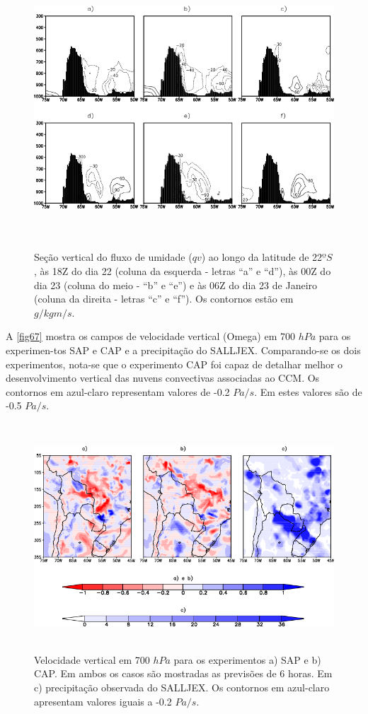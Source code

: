 \begin{figure}
\centering
\includegraphics[height=10.5cm]{./figs/sec_vert_flux_umi.png}
\caption{Seção vertical do fluxo de umidade ($qv$) ao longo da latitude de 22$ºS$, às 18Z do dia 22 (coluna da esquerda - letras ``a'' e ``d''), às 00Z do dia 23 (coluna do meio - ``b'' e ``e'') e às 06Z do dia 23 de Janeiro (coluna da direita - letras ``c'' e ``f''). Os contornos estão em $g/kg m/s$.}
\label{fig66}
\end{figure}

A \autoref{fig67} mostra os campos de velocidade vertical (Omega) em 700 $hPa$ para os experimen-tos SAP e CAP e a precipitação do SALLJEX. Comparando-se os dois experimentos, nota-se que o experimento CAP foi capaz de detalhar melhor o desenvolvimento vertical das nuvens convectivas associadas ao CCM. Os contornos em azul-claro representam valores de -0.2 $Pa/s$. Em  estes valores são de -0.5 $Pa/s$.
 
\begin{figure}
\centering
\includegraphics[height=8.5cm]{./figs/vel_vert_omega_salljex.png}
\caption{Velocidade vertical em 700 $hPa$ para os experimentos a) SAP e b) CAP. Em ambos os casos são mostradas as previsões de 6 horas. Em c) precipitação observada do SALLJEX. Os contornos em azul-claro apresentam valores iguais a -0.2 $Pa/s$.}
\label{fig67}
\end{figure}
